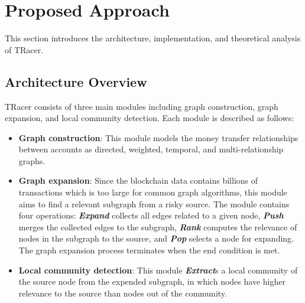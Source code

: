 \section{Proposed Approach}
\label{sec:proposed_approach}
This section introduces the architecture, implementation, and theoretical analysis of TRacer.

\subsection{Architecture Overview}
TRacer consists of three main modules including graph construction, graph expansion, and local community detection. Each module is described as follows:
\begin{itemize}
\item \textbf{Graph construction}: This module models the money transfer relationships between accounts as directed, weighted, temporal, and multi-relationship graphs.
\item \textbf{Graph expansion}: Since the blockchain data contains billions of transactions which is too large for common graph algorithms, this module aims to find a relevant subgraph from a risky source. The module contains four operations: \textit{\textbf{Expand}} collects all edges related to a given node, \textit{\textbf{Push}} merges the collected edges to the subgraph, \textit{\textbf{Rank}} computes the relevance of nodes in the subgraph to the source, and \textit{\textbf{Pop}} selects a node for expanding.
The graph expansion process terminates when the end condition is met.
\item \textbf{Local community detection}: This module \textit{\textbf{Extract}}s a local community of the source node from the expended subgraph, in which nodes have higher relevance to the source than nodes out of the community.
\end{itemize}

